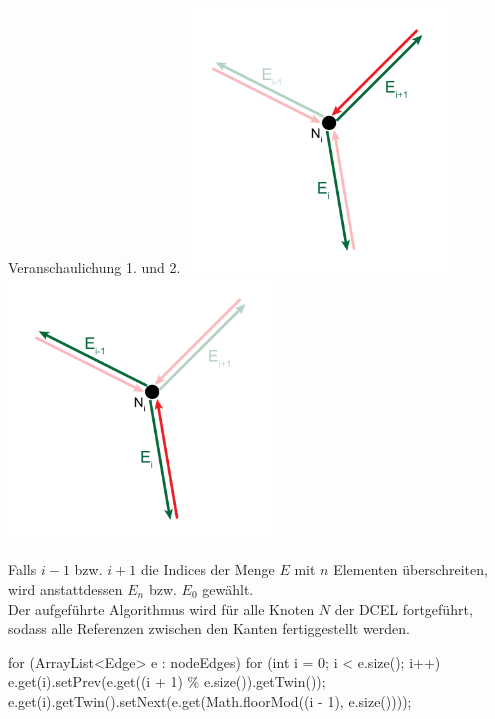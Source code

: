 \begin{Bild}{Veranschaulichung 1. und 2.}
	\includegraphics[width = 70mm]{Bilder/Beziehung1Kanten}
	\includegraphics[width = 70mm]{Bilder/Beziehung2Kanten}
\end{Bild}

Falls $i-1$ bzw. $i+1$ die Indices der Menge $E$ mit $n$ Elementen überschreiten, wird anstattdessen $E_n$ bzw. $E_0$ gewählt. \\
Der aufgeführte Algorithmus wird für alle Knoten $N$ der DCEL fortgeführt, sodass alle Referenzen zwischen den Kanten fertiggestellt werden.  \\

\begin{code}
	for (ArrayList<Edge> e : nodeEdges) {
		for (int i = 0; i < e.size(); i++) {
			e.get(i).setPrev(e.get((i + 1) \% e.size()).getTwin());
			e.get(i).getTwin().setNext(e.get(Math.floorMod((i - 1), e.size())));
		}
	}
\end{code}

